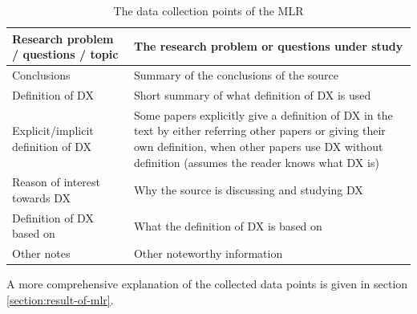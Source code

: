\documentclass[english, 12pt, a4paper, sci, utf8, a-1b, online]{aaltothesis}
\begin{document}
\begin{table}
\begin{center}
\begin{tabular}{ | p{} | p{} | }
      Research problem / questions / topic & The research problem or questions under study                                                                                                                                                                 \\ \hline
      Conclusions                          & Summary of the conclusions of the source                                                                                                                                                                      \\ \hline
      Definition of DX                     & Short summary of what definition of DX is used                                                                                                                                                                \\ \hline
      Explicit/implicit definition of DX   & Some papers explicitly give a definition of DX in the text by either referring other papers or giving their own definition, when other papers use DX without definition (assumes the reader knows what DX is) \\ \hline
      Reason of interest towards DX        & Why the source is discussing and studying DX                                                                                                                                                                  \\ \hline
      Definition of DX based on            & What the definition of DX is based on                                                                                                                                                                         \\ \hline
      Other notes                          & Other noteworthy information                                                                                                                                                                                  \\ \hline
    \end{tabular}
    \captionsetup{width=0.6\textwidth}
    \caption{The data collection points of the MLR}
    \label{table:data-collection-points}
  \end{center}
\end{table}

A more comprehensive explanation of the collected data points is given in section \ref{section:result-of-mlr}.

\clearpage
\end{document}
